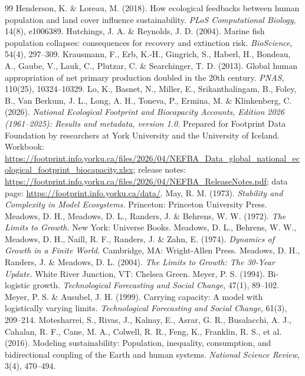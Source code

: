 \documentclass[preprint,12pt,authoryear]{elsarticle}
\begin{document}
\begin{thebibliography}{99}
 Henderson, K. \& Loreau, M. (2018). How ecological feedbacks between human population and land cover influence sustainability. \emph{PLoS Computational Biology}, 14(8), e1006389.
 Hutchings, J. A. \& Reynolds, J. D. (2004). Marine fish population collapses: consequences for recovery and extinction risk. \emph{BioScience}, 54(4), 297--309.
 Krausmann, F., Erb, K.-H., Gingrich, S., Haberl, H., Bondeau, A., Gaube, V., Lauk, C., Plutzar, C. \& Searchinger, T. D. (2013). Global human appropriation of net primary production doubled in the 20th century. \emph{PNAS}, 110(25), 10324--10329.
 Lo, K., Basnet, N., Miller, E., Srikanthalingam, B., Foley, B., Van Berkum, J. L., Long, A. H., Toneva, P., Ermina, M. \& Klinkenberg, C. (2026). \emph{National Ecological Footprint and Biocapacity Accounts, Edition 2026 (1961--2025): Results and metadata, version 1.0.} Prepared for Footprint Data Foundation by researchers at York University and the University of Iceland. Workbook: \url{https://footprint.info.yorku.ca/files/2026/04/NEFBA_Data_global_national_ecological_footprint_biocapacity.xlsx}; release notes: \url{https://footprint.info.yorku.ca/files/2026/04/NEFBA_ReleaseNotes.pdf}; data page: \url{https://footprint.info.yorku.ca/data/}.
 May, R. M. (1973). \emph{Stability and Complexity in Model Ecosystems.} Princeton: Princeton University Press.
 Meadows, D. H., Meadows, D. L., Randers, J. \& Behrens, W. W. (1972). \emph{The Limits to Growth.} New York: Universe Books.
 Meadows, D. L., Behrens, W. W., Meadows, D. H., Naill, R. F., Randers, J. \& Zahn, E. (1974). \emph{Dynamics of Growth in a Finite World.} Cambridge, MA: Wright-Allen Press.
 Meadows, D. H., Randers, J. \& Meadows, D. L. (2004). \emph{The Limits to Growth: The 30-Year Update.} White River Junction, VT: Chelsea Green.
 Meyer, P. S. (1994). Bi-logistic growth. \emph{Technological Forecasting and Social Change}, 47(1), 89--102.
 Meyer, P. S. \& Ausubel, J. H. (1999). Carrying capacity: A model with logistically varying limits. \emph{Technological Forecasting and Social Change}, 61(3), 209--214.
 Motesharrei, S., Rivas, J., Kalnay, E., Asrar, G. R., Busalacchi, A. J., Cahalan, R. F., Cane, M. A., Colwell, R. R., Feng, K., Franklin, R. S., et al. (2016). Modeling sustainability: Population, inequality, consumption, and bidirectional coupling of the Earth and human systems. \emph{National Science Review}, 3(4), 470--494.

\end{thebibliography}
\end{document}
